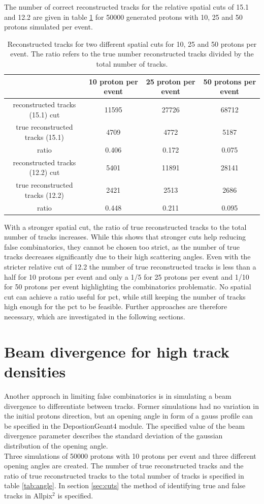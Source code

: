 The number of correct reconstructed tracks for the relative spatial cuts of 15.1 and 12.2 are given in table
\ref{tab:true_tracks} for 50000 generated protons with 10,
25 and 50 protons simulated per event.


\begin{table}
  \hspace{-1.5cm}
  \begin{tabular}{c | c c c}
    \toprule
     & 10 proton per event & 25 proton per event & 50 protons per event\\
    \midrule
    reconstructed tracks (15.1) cut & 11595 & 27726 & 68712  \\
    true reconstructed tracks (15.1) & 4709 & 4772  & 5187 \\
    ratio & 0.406 & 0.172 & 0.075 \\
    \midrule
    reconstructed tracks (12.2) cut & 5401 & 11891 & 28141 \\
    true reconstructed tracks (12.2) &  2421 &2513  & 2686 \\
    ratio & 0.448 & 0.211 & 0.095
  \end{tabular}
  \caption{Reconstructed tracks for two different spatial cuts for 10, 25 and 50 protons per event. The ratio refers to the true
  number reconstructed tracks divided by the total number of tracks.}
  \label{tab:true_tracks}
\end{table}

With a stronger spatial cut,  the ratio of true reconstructed tracks to
the total number of tracks increases. While this shows that stronger cuts help reducing false combinatorics, they cannot be chosen too strict,
as the number of true tracks decreases significantly due to their high scattering angles. Even with the stricter relative cut of 12.2 the
number of true reconstructed tracks is  less than a half for 10 protons per event and only a 1/5 for 25 protons per event and 1/10 for 50 protons per event highlighting
the combinatorics problematic. No spatial cut can achieve a ratio useful for pct, while still keeping the number
of tracks high enough for the pct to be feasible. Further approaches are therefore necessary, which are investigated in the following sections.

\section{Beam divergence for high track densities}
Another approach in limiting false combinatorics is in simulating a beam divergence to differentiate between tracks. Former simulations had no variation
in the initial protons direction, but an opening angle in form of a gauss profile can be specified in the DepostionGeant4 module. The specified value of
the beam divergence parameter describes the standard deviation of the gaussian distribution of the opening angle.  \\
Three simulations of 50000 protons with 10 protons per event and three different opening angles are created.
The number of true reconstructed tracks and the ratio
of true reconstructed tracks to the total number of tracks is specified in table \ref{tab:angle}. In section \ref{sec:cuts} the method of identifying
true and false tracks in Allpix$^2$ is specified.

